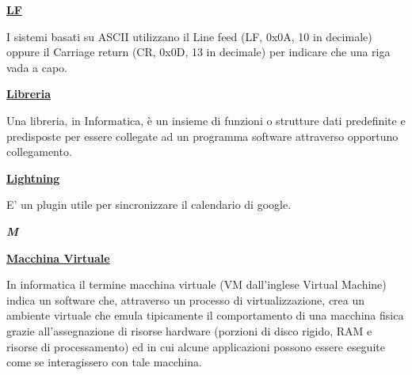 \bigskip

\begin{addmargin}[0em]{0em}	
	\textbf{\underline{LF}}
\end{addmargin}

\medskip
\begin{addmargin}[5em]{1em}	
I sistemi basati su ASCII utilizzano il Line feed (LF, 0x0A, 10 in decimale) oppure il Carriage return (CR, 0x0D, 13 in decimale) per indicare che una riga vada a capo.
\end{addmargin}	


\bigskip
\begin{addmargin}[0em]{0em}	
	\textbf{\underline{Libreria}}
\end{addmargin}

\medskip
\begin{addmargin}[5em]{1em}	
Una libreria, in Informatica, è un insieme di funzioni o strutture dati predefinite e predisposte per essere collegate ad un programma software attraverso opportuno collegamento.
\end{addmargin}	


\bigskip
\begin{addmargin}[0em]{0em}	
	\textbf{\underline{Lightning}}
\end{addmargin}
	
\medskip
\begin{addmargin}[5em]{1em}	
E' un plugin utile per sincronizzare il calendario di google.
\end{addmargin}


\newpage

\cleardoublepage
{}
{}
\noindent\hrulefill\hspace{4mm}\textbf{\textsl{\Huge{M}}}\hspace{4mm}\hrulefill

\vspace*{2\bigskipamount}

\begin{addmargin}[0em]{0em}	
	\textbf{\underline{Macchina Virtuale}} 
\end{addmargin}

\medskip
\begin{addmargin}[5em]{1em}
In informatica il termine macchina virtuale (VM dall'inglese Virtual Machine) indica un software che, attraverso un processo di virtualizzazione, crea un ambiente virtuale che emula tipicamente il comportamento di una macchina fisica grazie all'assegnazione di risorse hardware (porzioni di disco rigido, RAM e risorse di processamento) ed in cui alcune applicazioni possono essere eseguite come se interagissero con tale macchina.
\end{addmargin}	

